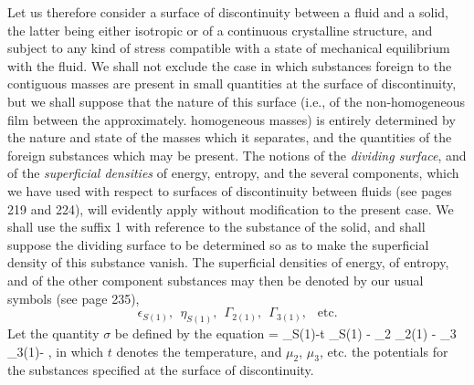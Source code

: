 \documentclass[12pt]{article}
\begin{document}
Let us therefore consider a surface of discontinuity between a fluid and a solid, the latter being either isotropic or of a continuous crystalline structure, and subject to any kind of stress compatible with a state of mechanical equilibrium with the fluid. We shall not exclude the case in which substances foreign to the contiguous masses are present in small quantities at the surface of discontinuity, but we shall suppose that the nature of this surface (i.e., of the non-homogeneous film between the approximately. homogeneous masses) is entirely determined by the nature and state of the masses which it separates, and the quantities of the foreign substances which may be present. The notions of the \textit{dividing surface}, and of the \textit{superficial densities} of energy, entropy, and the several components, which we have used with respect to surfaces of discontinuity between fluids (see pages 219 and 224), will evidently apply without modification to the present case. We shall use the suffix 1 with reference to the substance of the solid, and shall suppose the dividing surface to be determined so as to make the superficial density of this substance vanish. The superficial densities of energy, of entropy, and of the other component substances may then be denoted by our usual symbols (see page 235),
$$ \epsilon_{S(1)}, \ \ \eta_{S(1)}, \ \ \Gamma_{2(1)}, \ \ \Gamma_{3(1)},\ \  \text{ etc.}$$
Let the quantity $\sigma$ be defined by the equation
\eqs \sigma = \epsilon_{S(1)}-t \eta_{S(1)} - \mu_2 \Gamma_{2(1)} - \mu_3 \Gamma_{3(1)}- ,  \label{659} \eqe
in which $t$ denotes the temperature, and $\mu_2$, $\mu_3$, etc. the potentials for the substances specified at the surface of discontinuity.
\end{document}
